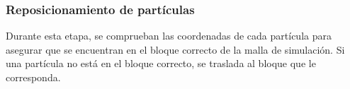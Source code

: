 \subsubsection{Reposicionamiento de partículas}

Durante esta etapa, se comprueban las coordenadas de cada partícula para
asegurar que se encuentran en el bloque correcto de la malla de simulación.
Si una partícula no está en el bloque correcto, se traslada al bloque que le
corresponda.
